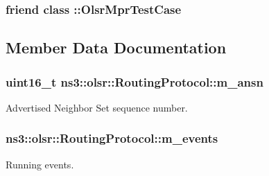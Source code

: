 \subsubsection[{\texorpdfstring{\+::\+Olsr\+Mpr\+Test\+Case}{::OlsrMprTestCase}}]{\setlength{\rightskip}{0pt plus 5cm}friend class \+::{\bf Olsr\+Mpr\+Test\+Case}\hspace{0.3cm}{\ttfamily [friend]}}\hypertarget{classns3_1_1olsr_1_1RoutingProtocol_a207c4dff8592b10a0fa2924d05c40380}{}\label{classns3_1_1olsr_1_1RoutingProtocol_a207c4dff8592b10a0fa2924d05c40380}


\subsection{Member Data Documentation}
\subsubsection[{\texorpdfstring{m\+\_\+ansn}{m_ansn}}]{\setlength{\rightskip}{0pt plus 5cm}uint16\+\_\+t ns3\+::olsr\+::\+Routing\+Protocol\+::m\+\_\+ansn\hspace{0.3cm}{\ttfamily [private]}}\hypertarget{classns3_1_1olsr_1_1RoutingProtocol_a8c7b6d3b6eab86260e8ac9848e6f2621}{}\label{classns3_1_1olsr_1_1RoutingProtocol_a8c7b6d3b6eab86260e8ac9848e6f2621}


Advertised Neighbor Set sequence number. 

\subsubsection[{\texorpdfstring{m\+\_\+events}{m_events}}]{ ns3\+::olsr\+::\+Routing\+Protocol\+::m\+\_\+events\hspace{0.3cm}{\ttfamily [private]}}\hypertarget{classns3_1_1olsr_1_1RoutingProtocol_a80368d3da46150cf3fc9139c40f33d53}{}\label{classns3_1_1olsr_1_1RoutingProtocol_a80368d3da46150cf3fc9139c40f33d53}


Running events. 

